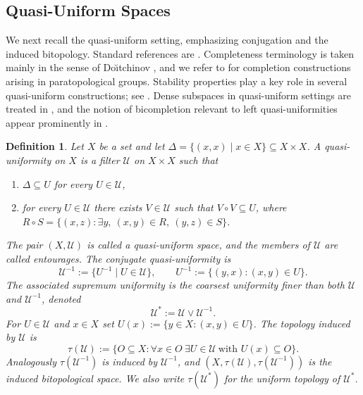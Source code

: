 \documentclass[preprint,12pt]{elsarticle}
\newtheorem{definition}[theorem]{Definition}
\begin{document}
\subsection{Quasi-Uniform Spaces}\label{ssec:qu}

We next recall the quasi-uniform setting, emphasizing conjugation and
the induced bitopology. Standard references are
\cite{FletcherLindgren,Isbell1964,Kunzi2001}. Completeness terminology is
taken mainly in the sense of Do\u{\i}tchinov \cite{Doitchinov1991}, and
we refer to \cite{KunziRomagueraSipacheva1998} for completion
constructions arising in paratopological groups. Stability properties
play a key role in several quasi-uniform constructions; see
\cite{KunziJunnila1993}. Dense subspaces in quasi-uniform settings are
treated in \cite{KunziLuethy1995}, and the notion of bicompletion  relevant
to left quasi-uniformities appear prominently in \cite{MarinRomaguera1998}.

\begin{definition}
\label{def:qu:basic}
Let $X$ be a set and let
$\Delta=\{(x,x)\mid x\in X\}\subseteq X\times X$. A \emph{quasi-uniformity}
on $X$ is a filter $\mathcal{U}$ on $X\times X$ such that
\begin{enumerate}[label=\textup{(\roman*)}]
\item $\Delta\subseteq U$ for every $U\in\mathcal{U}$,
\item for every $U\in\mathcal{U}$ there exists $V\in\mathcal{U}$ such
that $V\circ V\subseteq U$, where
$R\circ S=\{(x,z):\exists y,\ (x,y)\in R,\ (y,z)\in S\}$.
\end{enumerate}
The pair $(X,\mathcal{U})$ is called a \emph{quasi-uniform space}, and
the members of $\mathcal{U}$ are called \emph{entourages}. The
\emph{conjugate} quasi-uniformity is
\[
\mathcal{U}^{-1}:=\{U^{-1}\mid U\in\mathcal{U}\},
\qquad
U^{-1}:=\{(y,x):(x,y)\in U\}.
\]
The \emph{associated supremum uniformity} is the coarsest uniformity
finer than both $\mathcal{U}$ and $\mathcal{U}^{-1}$, denoted
\[
\mathcal{U}^{*}:=\mathcal{U}\vee\mathcal{U}^{-1}.
\]
For $U\in\mathcal{U}$ and $x\in X$ set $U(x):=\{y\in X:(x,y)\in U\}$.
The topology induced by $\mathcal{U}$ is
\[
\tau(\mathcal{U})
:=\{O\subseteq X:\forall x\in O\ \exists U\in\mathcal{U}\ \text{with }
U(x)\subseteq O\}.
\]
Analogously $\tau(\mathcal{U}^{-1})$ is induced by $\mathcal{U}^{-1}$,
and $(X,\tau(\mathcal{U}),\tau(\mathcal{U}^{-1}))$ is the induced
\emph{bitopological space}. We also write $\tau(\mathcal{U}^{*})$ for
the uniform topology of $\mathcal{U}^{*}$.
\end{definition}
\end{document}
